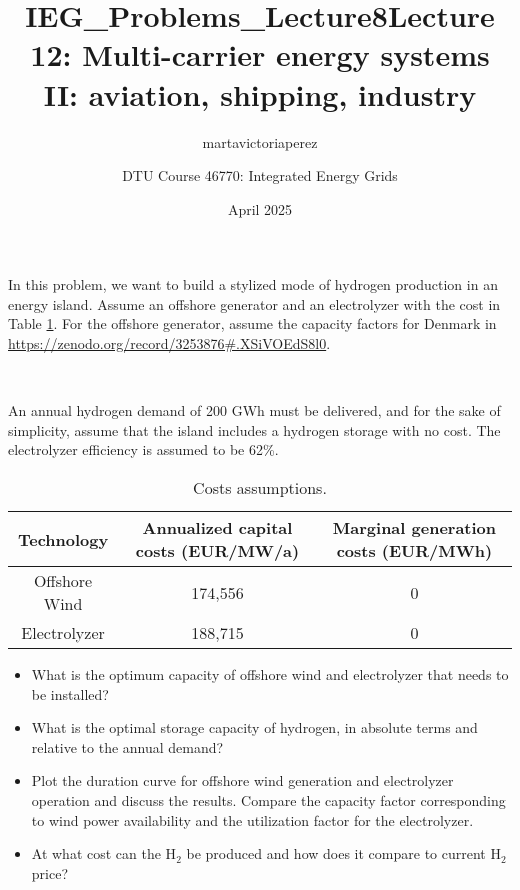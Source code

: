 \documentclass[10pt]{article}
\title{IEG_Problems_Lecture8}
\author{martavictoriaperez }
\date{April 2025}
\newenvironment{problem}[2][Problem]{\begin{trivlist}
\item[\hskip \labelsep {\bfseries #1}\hskip \labelsep {\bfseries #2.}]}{\end{trivlist}}
\begin{document}
 
\title{\textbf{Lecture 12: Multi-carrier energy systems II: aviation, shipping, industry}}
\author{DTU Course 46770: Integrated Energy Grids }
\maketitle

\begin{problem}{12.1}

In this problem, we want to build a stylized mode of hydrogen production in an energy island. Assume an offshore generator and an electrolyzer with the cost in Table \ref{tab:my_label}. For the offshore generator, assume the capacity factors for Denmark in \url{https://zenodo.org/record/3253876#.XSiVOEdS8l0}.

\

An annual hydrogen demand of 200 GWh must be delivered, and for the sake of simplicity, assume that the island includes a hydrogen storage with no cost. The electrolyzer efficiency is assumed to be 62\%.



\begin{table}[h]
    \centering
    \begin{tabular}{ccc}
    \hline
        Technology & Annualized capital costs (EUR/MW/a) & Marginal generation costs (EUR/MWh) \\
    \hline
    Offshore Wind &  174,556 & 0 \\
         Electrolyzer & 188,715 & 0 \\
    \hline
    \end{tabular}
    \caption{Costs assumptions.}
    \label{tab:my_label}
\end{table}

\begin{itemize}
\item[a)] What is the optimum capacity of offshore wind and electrolyzer that needs to be installed?

\item[b)] What is the optimal storage capacity of hydrogen, in absolute terms and relative to the annual demand?

\item[c)] Plot the duration curve for offshore wind generation and electrolyzer operation and discuss the results. Compare the capacity factor corresponding to wind power availability and the utilization factor for the electrolyzer. 

\item[d)] At what cost can the H$_2$ be produced and how does it compare to current H$_2$ price?

\end{itemize}


\end{problem}
\end{document}
